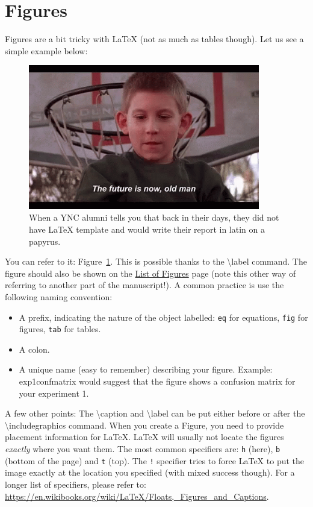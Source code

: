 \section{Figures}
Figures are a bit tricky with LaTeX {\tiny(not as much as tables though)}.
Let us see a simple example below:
\begin{figure}[!h]
  \centering
    \includegraphics[width=0.9\textwidth]{figures/future.png}
  \caption{When a YNC alumni tells you that back in their days, they did not have LaTeX template and would write their report in latin on a papyrus.}
  \label{fig:future}
\end{figure}
You can refer to it: Figure~\ref{fig:future}.
This is possible thanks to the \textbackslash{}label command.
The figure should also be shown on the \hyperref[lst:figs]{List of Figures} page (note this other way of referring to another part of the manuscript!).
A common practice is use the following naming convention:
\begin{itemize}
  \item A prefix, indicating the nature of the object labelled: \texttt{eq} for equations, \texttt{fig} for figures, \texttt{tab} for tables.
  \item A colon.
  \item A unique name (easy to remember) describing your figure. Example: exp1confmatrix would suggest that the figure shows a confusion matrix for your experiment 1.
\end{itemize}

A few other points: The \textbackslash{}caption and \textbackslash{}label can be put either before or after the \textbackslash{}includegraphics command.
When you create a Figure, you need to provide placement information for LaTeX. LaTeX will usually not locate the figures \emph{exactly} where you want them.
The most common specifiers are: \texttt{h} (here), \texttt{b} (bottom of the page) and \texttt{t} (top). The \texttt{!} specifier tries to force LaTeX to put the image exactly at the location you specified (with mixed success though).
For a longer list of specifiers, please refer to: \url{https://en.wikibooks.org/wiki/LaTeX/Floats,_Figures_and_Captions}.

